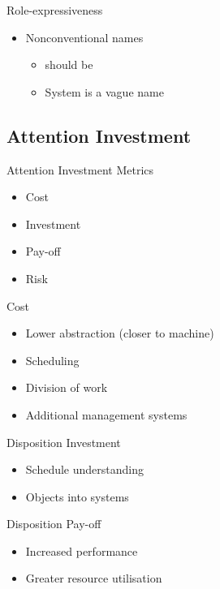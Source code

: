 \begin{frame}{\secname}{\subsecname}
	Role-expressiveness
	\begin{itemize}
		\item Nonconventional names
		\begin{itemize}
			\item {} should be 
			\item System is a vague name
		\end{itemize}
	\end{itemize}
\end{frame}

\subsection{Attention Investment}
\begin{frame}{\secname}{\subsecname}
	Attention Investment Metrics
	\begin{itemize}
		\item Cost
		\item Investment
		\item Pay-off
		\item Risk
	\end{itemize}
\end{frame}

\begin{frame}{\secname}{\subsecname}
	Cost
	\begin{itemize}
		\item Lower abstraction (closer to machine)
		\item Scheduling
		\item Division of work
		\item Additional management systems
	\end{itemize}
\end{frame}

\begin{frame}{\secname}{Disposition}
	Investment
	\begin{itemize}
		\item Schedule understanding
		\item Objects into systems
	\end{itemize}
\end{frame}

\begin{frame}{\secname}{Disposition}
	Pay-off
	\begin{itemize}
		\item Increased performance
		\item Greater resource utilisation
	\end{itemize}
\end{frame}


